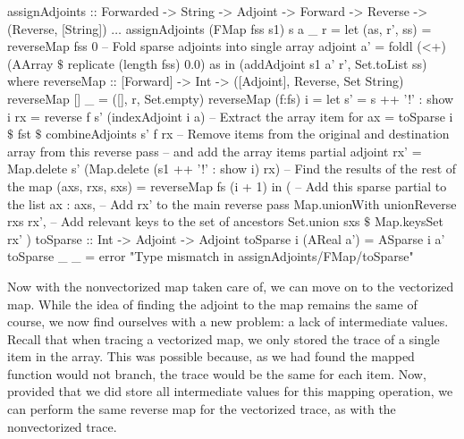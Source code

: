             \begin{haskell}[caption=Implementation of \texttt{assignAdjoints} for the map operation, label=lst:assign_map, gobble=16]
                assignAdjoints :: Forwarded -> String -> Adjoint -> Forward -> Reverse
                -> (Reverse, [String])
                $\dots$
                assignAdjoints (FMap fss s1) s a _ r =
                    let (as, r', ss) = reverseMap fss 0
                        -- Fold sparse adjoints into single array adjoint
                        a' = foldl (<+) (AArray $\$$ replicate (length fss) 0.0) as
                    in  (addAdjoint s1 a' r', Set.toList ss)
                    where
                        reverseMap :: [Forward] -> Int -> ([Adjoint], Reverse, Set String)
                        reverseMap []     _ = ([], r, Set.empty)
                        reverseMap (f:fs) i =
                            let s'  = s ++ '!' : show i
                                rx  = reverse f s' (indexAdjoint i a)
                                -- Extract the array item for 
                                ax  = toSparse i $\$$ fst $\$$ combineAdjoints s' f rx
                                -- Remove items from the original and destination array from this reverse pass
                                -- and add the array items partial adjoint
                                rx' = Map.delete s' (Map.delete (s1 ++ '!' : show i) rx)
                                -- Find the results of the rest of the map
                                (axs, rxs, sxs) = reverseMap fs (i + 1)
                            in  (
                                -- Add this sparse partial to the list
                                ax : axs,
                                -- Add rx' to the main reverse pass
                                Map.unionWith unionReverse rxs rx',
                                -- Add relevant keys to the set of ancestors
                                Set.union sxs $\$$ Map.keysSet rx'
                            )
                        toSparse :: Int -> Adjoint -> Adjoint
                        toSparse i (AReal a') = ASparse i a'
                        toSparse _ _          =
                            error "Type mismatch in assignAdjoints/FMap/toSparse"
            \end{haskell}

            Now with the nonvectorized map taken care of, we can move on to the vectorized map.
            While the idea of finding the adjoint to the map remains the same of course, we now find ourselves with a new problem: a lack of intermediate values.
            Recall that when tracing a vectorized map, we only stored the trace of a single item in the array.
            This was possible because, as we had found the mapped function would not branch, the trace would be the same for each item.
            Now, provided that we did store all intermediate values for this mapping operation, we can perform the same reverse map for the vectorized trace, as with the nonvectorized trace.

